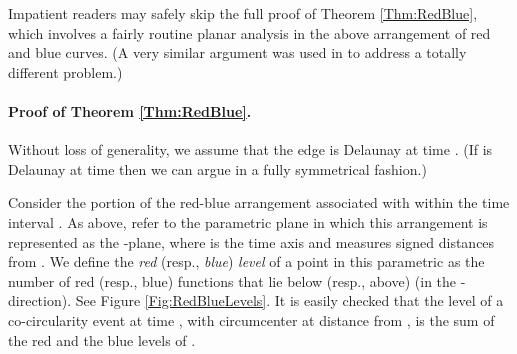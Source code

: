 \documentclass[letter,11pt]{article}
\begin{document}
Impatient readers may safely skip the full proof of Theorem \ref{Thm:RedBlue}, which involves a fairly routine 
planar analysis in the above arrangement  of red and blue curves. (A very similar argument was used in \cite{ASS} to address a totally different problem.)


\paragraph{Proof of Theorem \ref{Thm:RedBlue}.}
Without loss of generality, we assume that the edge  is Delaunay at time . (If  is Delaunay at time  then we can argue in a fully symmetrical fashion.)

Consider the portion of the red-blue arrangement associated with  within the time interval . As above, refer to the parametric plane in which this arrangement is represented as the -plane, where  is the time axis and  measures signed distances  from .
We define the {\it red} (resp., {\it blue}) {\it level} of a point  in this parametric  as the number of red (resp., blue) functions that lie below (resp., above)  (in the -direction). See Figure \ref{Fig:RedBlueLevels}.
It is easily checked that the level of a co-circularity event at time , with circumcenter at distance  from , is the sum of the red and the blue levels of .
\end{document}
